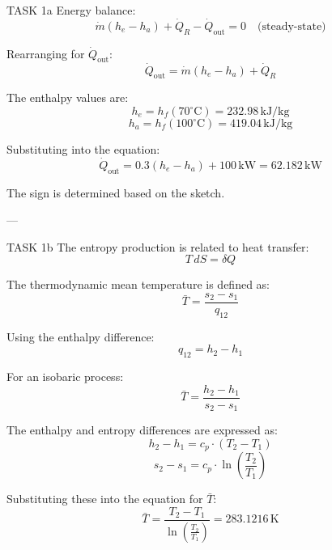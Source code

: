 TASK 1a  
Energy balance:  
\[
\dot{m}(h_e - h_a) + \dot{Q}_R - \dot{Q}_{\text{out}} = 0 \quad \text{(steady-state)}
\]  

Rearranging for \(\dot{Q}_{\text{out}}\):  
\[
\dot{Q}_{\text{out}} = \dot{m}(h_e - h_a) + \dot{Q}_R
\]  

The enthalpy values are:  
\[
h_e = h_f(70^\circ\text{C}) = 232.98 \, \text{kJ/kg}
\]  
\[
h_a = h_f(100^\circ\text{C}) = 419.04 \, \text{kJ/kg}
\]  

Substituting into the equation:  
\[
\dot{Q}_{\text{out}} = 0.3 \left(h_e - h_a\right) + 100 \, \text{kW} = 62.182 \, \text{kW}
\]  

The sign is determined based on the sketch.  

---

TASK 1b  
The entropy production is related to heat transfer:  
\[
T \, dS = \delta Q
\]  

The thermodynamic mean temperature is defined as:  
\[
\bar{T} = \frac{s_2 - s_1}{q_{12}}
\]  

Using the enthalpy difference:  
\[
q_{12} = h_2 - h_1
\]  

For an isobaric process:  
\[
\bar{T} = \frac{h_2 - h_1}{s_2 - s_1}
\]  

The enthalpy and entropy differences are expressed as:  
\[
h_2 - h_1 = c_p \cdot (T_2 - T_1)
\]  
\[
s_2 - s_1 = c_p \cdot \ln\left(\frac{T_2}{T_1}\right)
\]  

Substituting these into the equation for \(\bar{T}\):  
\[
\bar{T} = \frac{T_2 - T_1}{\ln\left(\frac{T_2}{T_1}\right)} = 283.1216 \, \text{K}
\]  